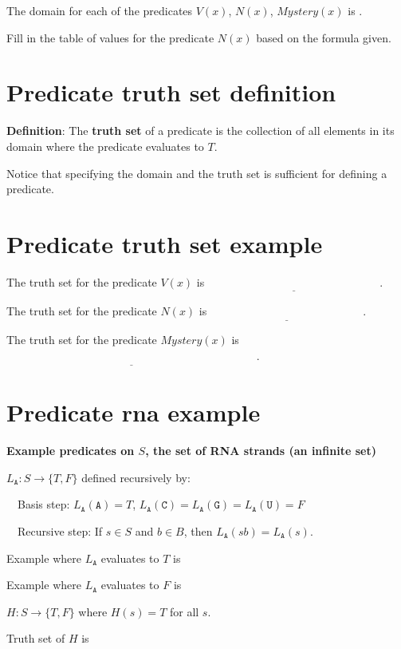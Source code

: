 \documentclass[12pt, oneside]{article}
\newcommand{\A}[0]{\texttt{A}}
\newcommand{\C}[0]{\texttt{C}}
\newcommand{\G}[0]{\texttt{G}}
\newcommand{\U}[0]{\texttt{U}}
\begin{document}
    The domain for each of the predicates $V(x)$, $N(x)$, $Mystery(x)$ is
    \underline{}.

    Fill in the table of values for the predicate $N(x)$ based on the formula given. \vfill
\section*{Predicate truth set definition}


{\bf Definition}: The {\bf truth  set} of a  predicate is the collection of all elements in its
domain where the predicate evaluates to $T$.

Notice that specifying the domain and the truth set is sufficient for defining
a predicate. \vfill
\section*{Predicate truth set example}


The truth set for the predicate $V(x)$ is $\underline{\phantom{\{ x ~\mid~ V(x) = T\} = \{ 001, 010, 011 \}}}$.

The truth set for the predicate $N(x)$ is $\underline{\phantom{\{ x ~\mid~ N(x) = T\} = \{ 101, 111 \}}}$.

The truth set for the predicate $Mystery(x)$ is $\underline{\phantom{\{ x ~\mid~ Mystery(x) = T\} = \{ 000, 001, 010, 101, 111 \}}}$.


\vfill \vfill
\section*{Predicate rna example}


{\bf Example predicates on $S$, the set of RNA strands (an infinite set)}


$L_{\A}: S \to \{T, F\}$  defined recursively by: 

~~Basis step: $L_{\A}(\A) = T$, $L_{\A}(\C) = L_{\A}(\G) = L_{\A}(\U) = F$

~~Recursive step: If $s \in S$ and $b \in B$, then $L_{\A}(sb) = L_{\A}(s)$.

Example where $L_{\A}$ evaluates to $T$ is \underline{\phantom{$\A\C\G$~\hspace{1in}}}

\vfill

Example where $L_{\A}$ evaluates to $F$ is \underline{\phantom{$\U\A\C\U$\hspace{1in}}}

\vfill


$H: S \to \{T, F\}$ where $H(s) = T$ for all $s$.

Truth set of $H$ is \underline{}

\vfill
 \vfill
\end{document}
